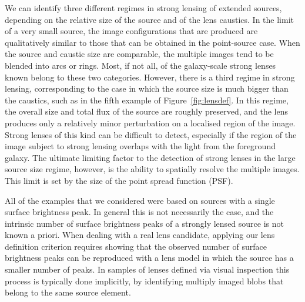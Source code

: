 \documentclass{aa}
\def\Fref#1{Figure~\ref{#1}\xspace}
\begin{document}
We can identify three different regimes in strong lensing of extended sources, depending on the relative size of the source and of the lens caustics.
In the limit of a very small source, the image configurations that are produced are qualitatively similar to those that can be obtained in the point-source case.
When the source and caustic size are comparable, the multiple images tend to be blended into arcs or rings. 
Most, if not all, of the galaxy-scale strong lenses known belong to these two categories.
However, there is a third regime in strong lensing, corresponding to the case in which the source size is much bigger than the caustics, such as in the fifth example of \Fref{fig:lensdef}.
In this regime, the overall size and total flux of the source are roughly preserved, and the lens produces only a relatively minor perturbation on a localised region of the image.
Strong lenses of this kind can be difficult to detect, especially if the region of the image subject to strong lensing overlaps with the light from the foreground galaxy. 
The ultimate limiting factor to the detection of strong lenses in the large source size regime, however, is the ability to spatially resolve the multiple images. This limit is set by the size of the point spread function (PSF).

All of the examples that we considered were based on sources with a single surface brightness peak.
In general this is not necessarily the case, and the intrinsic number of surface brightness peaks of a strongly lensed source is not known a priori.
When dealing with a real lens candidate, applying our lens definition criterion requires showing that the observed number of surface brightness peaks can be reproduced with a lens model in which the source has a smaller number of peaks.
In samples of lenses defined via visual inspection this process is typically done implicitly, by identifying multiply imaged blobs that belong to the same source element.
\end{document}
